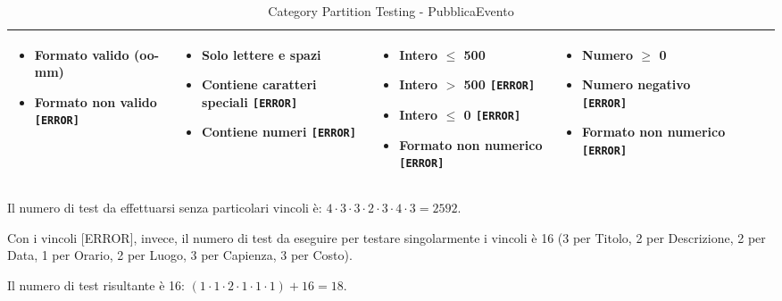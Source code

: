 \begin{table}[H]
\begin{tabularx}{\textwidth}{|X|X|X|X|X|X|X|}
		\parbox[t]{\linewidth}{\begin{itemize}[leftmargin=*]
			\item Formato valido (oo-mm) \checkmark
			\item Formato non valido \texttt{[ERROR]}
		\end{itemize}} &

		\parbox[t]{\linewidth}{\begin{itemize}[leftmargin=*]
			\item Solo lettere e spazi \checkmark
			\item Contiene caratteri speciali \texttt{[ERROR]}
			\item Contiene numeri \texttt{[ERROR]}
		\end{itemize}} &

		\parbox[t]{\linewidth}{\begin{itemize}[leftmargin=*]
			\item Intero $\leq$ 500 \checkmark
			\item Intero $>$ 500 \texttt{[ERROR]}
			\item Intero $\leq$ 0 \texttt{[ERROR]}
			\item Formato non numerico \texttt{[ERROR]}
		\end{itemize}} &

		\parbox[t]{\linewidth}{\begin{itemize}[leftmargin=*]
			\item Numero $\geq$ 0 \checkmark
			\item Numero negativo \texttt{[ERROR]}
			\item Formato non numerico \texttt{[ERROR]}
		\end{itemize}} \\
		\hline
	\end{tabularx}
	\caption{Category Partition Testing - PubblicaEvento}
\end{table}

\noindent Il numero di test da effettuarsi senza particolari vincoli è: $4 \cdot 3 \cdot 3 \cdot 2 \cdot 3 \cdot 4 \cdot 3 = 2592$.

\noindent Con i vincoli [ERROR], invece, il numero di test da eseguire per testare singolarmente i vincoli è 16 (3 per Titolo, 2 per Descrizione, 2 per Data, 1 per Orario, 2 per Luogo, 3 per Capienza, 3 per Costo).

\noindent Il numero di test risultante è 16: $(1 \cdot 1 \cdot 2\cdot 1 \cdot 1 \cdot 1) + 16 = 18$.



